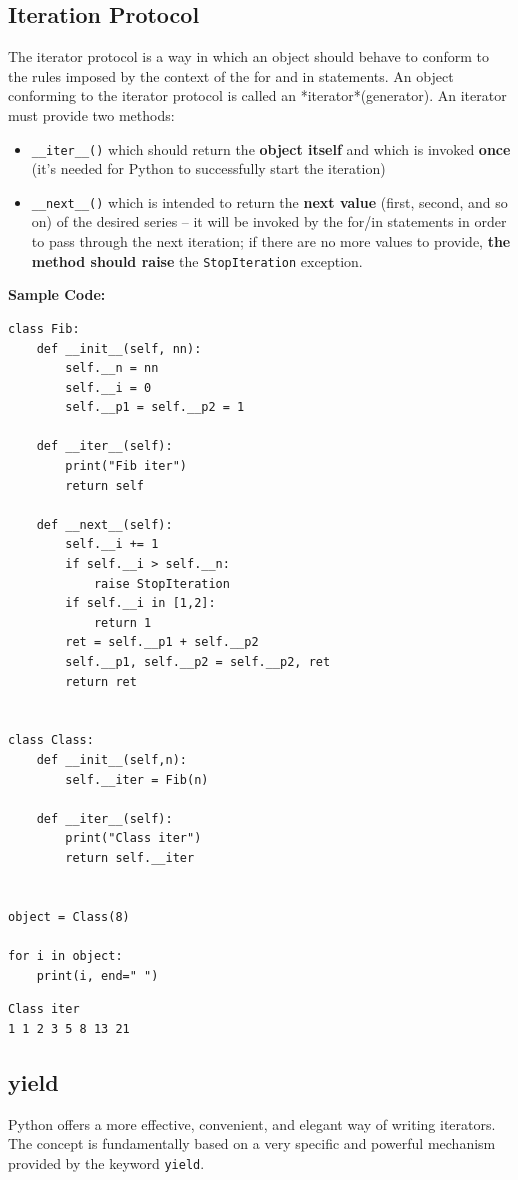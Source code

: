 \documentclass[11pt]{article}
\begin{document}
\subsection{Iteration Protocol}
\label{sec:org202f7a4}
The iterator protocol is a way in which an object should behave to
conform to the rules imposed by the context of the for and in
statements. An object conforming to the iterator protocol is called an
*iterator*(generator). An iterator must provide two methods:

\begin{itemize}
\item \texttt{\_\_iter\_\_()} which should return the \textbf{object itself} and which is
invoked \textbf{once} (it’s needed for Python to successfully start the
iteration)

\item \texttt{\_\_next\_\_()} which is intended to return the \textbf{next value} (first,
second, and so on) of the desired series – it will be invoked by the
for/in statements in order to pass through the next iteration; if
there are no more values to provide, \textbf{the method should raise} the
\texttt{StopIteration} exception.
\end{itemize}

\textbf{Sample Code:}

\begin{verbatim}
class Fib:
	def __init__(self, nn):
		self.__n = nn
		self.__i = 0
		self.__p1 = self.__p2 = 1

	def __iter__(self):
		print("Fib iter")
		return self

	def __next__(self):
		self.__i += 1
		if self.__i > self.__n:
			raise StopIteration
		if self.__i in [1,2]:
			return 1
		ret = self.__p1 + self.__p2
		self.__p1, self.__p2 = self.__p2, ret
		return ret


class Class:
	def __init__(self,n):
		self.__iter = Fib(n)

	def __iter__(self):
		print("Class iter")
		return self.__iter


object = Class(8)

for i in object:
	print(i, end=" ")

\end{verbatim}

\begin{verbatim}
Class iter
1 1 2 3 5 8 13 21 
\end{verbatim}

\subsection{yield}
\label{sec:orgd70806f}
Python offers a more effective, convenient, and elegant way of writing
iterators. The concept is fundamentally based on a very specific and
powerful mechanism provided by the keyword \texttt{yield}. 
\end{document}
